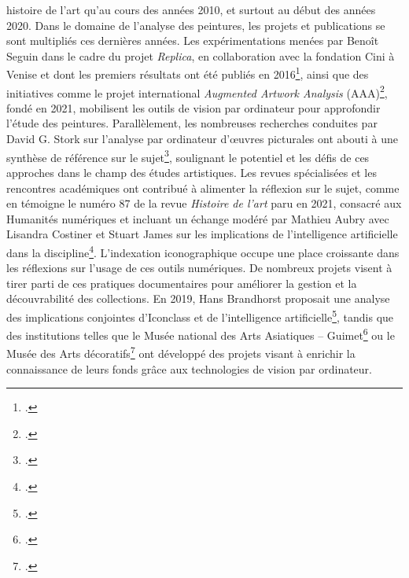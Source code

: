 histoire de l’art qu’au cours des années 2010, et surtout au début des années 2020. Dans le domaine de l’analyse des peintures, les projets et publications se sont multipliés ces dernières années. Les expérimentations menées par Benoît Seguin dans le cadre du projet \textit{Replica}, en collaboration avec la fondation Cini à Venise et dont les premiers résultats ont été publiés en 2016\footcites{seguinVisualLinkRetrieval2016}{dilenardoVisualPatternsDiscovery2016}, ainsi que des initiatives comme le projet international \textit{Augmented Artwork Analysis} (AAA)\footcite{AugmentedArtworkAnalysis}, fondé en 2021, mobilisent les outils de vision par ordinateur pour approfondir l’étude des peintures. Parallèlement, les nombreuses recherches conduites par David G. Stork sur l’analyse par ordinateur d’œuvres picturales ont abouti à une synthèse de référence sur le sujet\footcite{storkPixelsPaintingsFoundations2024}, soulignant le potentiel et les défis de ces approches dans le champ des études artistiques. Les revues spécialisées et les rencontres académiques ont contribué à alimenter la réflexion sur le sujet, comme en témoigne le numéro 87 de la revue \textit{Histoire de l’art} paru en 2021, consacré aux Humanités numériques et incluant un échange modéré par Mathieu Aubry avec Lisandra Costiner et Stuart James sur les implications de l'intelligence artificielle dans la discipline\footcite{aubryArtificialIntelligenceArt2021}. L’indexation iconographique occupe une place croissante dans les réflexions sur l’usage de ces outils numériques. De nombreux projets visent à tirer parti de ces pratiques documentaires pour améliorer la gestion et la découvrabilité des collections. En 2019, Hans Brandhorst proposait une analyse des implications conjointes d’Iconclass et de l'intelligence artificielle\footcite{brandhorstWordWorthThousand2019}, tandis que des institutions telles que le Musée national des Arts Asiatiques – Guimet\footcite{HikarIA} ou le Musée des Arts décoratifs\footcite{bermesRepenserCollectionsPatrimoniales2025} ont développé des projets visant à enrichir la connaissance de leurs fonds grâce aux technologies de vision par ordinateur.

